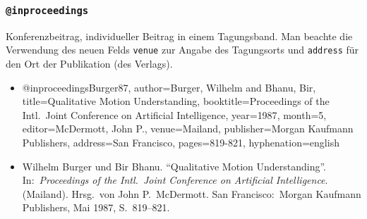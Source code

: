 
\subsubsection{\texttt{@inproceedings}}
\label{sec:@inproceedings}
Konferenzbeitrag, individueller Beitrag in einem Tagungsband.
Man beachte die Verwendung des neuen Felds \texttt{venue}
zur Angabe des Tagungsorts und 
\texttt{address} für den Ort der Publikation (des Verlags).

\begin{itemize}
\item[]
\begin{GenericCode}[numbers=none]
@inproceedings{Burger87,
	author={Burger, Wilhelm and Bhanu, Bir},
	title={Qualitative Motion Understanding},
	booktitle={Proceedings of the Intl.\ Joint Conference on Artificial Intelligence},
	year={1987},
	month={5},
	editor={McDermott, John P.},
	venue={Mailand},
	publisher={Morgan Kaufmann Publishers},
	address={San Francisco},
	pages={819-821},
	hyphenation={english}
}
\end{GenericCode}
\item[\cite{Burger87}]
Wilhelm Burger und Bir Bhanu. "`Qualitative Motion Understanding"'.
In:\ \textit{Proceedings of the Intl.\ Joint Conference on Artificial Intelligence}.
(Mailand). Hrsg.\ von John P.\ McDermott. San Francisco:\ Morgan
Kaufmann Publishers, Mai 1987, S.\ 819--821.
\end{itemize}


